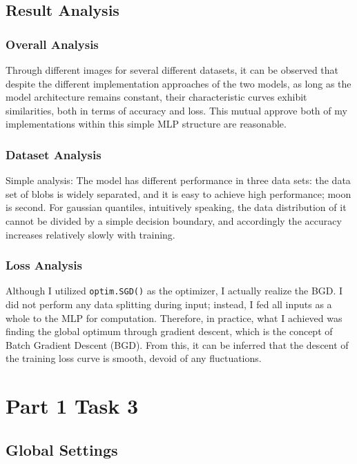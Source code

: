 \documentclass{article}
\begin{document}
\subsection{Result Analysis}

\subsubsection{Overall Analysis}

Through different images for several different datasets, it can be observed that despite the different implementation approaches of the two models, as long as the model architecture remains constant, their characteristic curves exhibit similarities, both in terms of accuracy and loss. This mutual approve both of my implementations within this simple MLP structure are reasonable.

\subsubsection{Dataset Analysis}

Simple analysis: The model has different performance in three data sets: the data set of blobs is widely separated, and it is easy to achieve high performance; moon is second. For gaussian quantiles, intuitively speaking, the data distribution of it cannot be divided by a simple decision boundary, and accordingly the accuracy increases relatively slowly with training.

\subsubsection{Loss Analysis}\label{sec:p1t1_ana_loss}

Although I utilized \texttt{optim.SGD()} as the optimizer, I actually realize the BGD. I did not perform any data splitting during input; instead, I fed all inputs as a whole to the MLP for computation. Therefore, in practice, what I achieved was finding the global optimum through gradient descent, which is the concept of Batch Gradient Descent (BGD). From this, it can be inferred that the descent of the training loss curve is smooth, devoid of any fluctuations.

\section{Part 1 Task 3}

\subsection{Global Settings}
\end{document}
